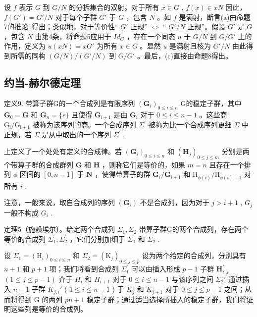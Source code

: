 设 \(f\) 表示 \(G\) 到 \(G/N\) 的分拆集合的双射。对于所有 \(x \in G\) , \(f(x) \in xN\) 因此， \(f(G') = G'/N\) 对于每个子群 \(G'\) 于 \(G\) ，包含 \(N\) 。如 \(f\) 是满射，断言(a)由命题7的推论1得出；类似地，对于等价性“ \(G'\) 正规'' \(\Leftrightarrow\) `` \(G'/N\) 正规''。假设 \(G'\) 是 \(G\) ，包含 \(N\) 由第4条，将命题5应用于 \(Id_G\) ，存在一个同态 \(u\) 于 \(G/N\) 到 \(G/G'\) 上的作用，定义为 \(u(xN) = xG'\) 为所有 \(x \in G\) 。显然 \(u\) 是满射且核为 \(G'/N\) 由此得到所需的同构 \((G/N)/(G'/N)\) 到 \(G/G'\) 。最后，(c)直接由命题8得出。

\subsection{约当-赫尔德定理}

定义9. 带算子群G的一个合成列是有限序列 \((\mathbf{G}_i)_{0\leqslant i\leqslant n}\) G的稳定子群，其中 \(\mathbf{G}_0 = \mathbf{G}\) 和 \(\mathbf{G}_n = \{e\}\) 且使得 \(\mathbf{G}_{i + 1}\) 是由 \(\mathbf{G}_i\) 对于 \(0\leqslant i\leqslant n - 1\) 。这些商 \(\mathrm{G_i / G_{i + 1}}\) 被称为该序列的商。一个合成序列 \(\Sigma^{\prime}\) 被称为比一个合成序列更细 \(\Sigma\) 中正规，若 \(\Sigma\) 是从中取出的一个序列 \(\Sigma^{\prime}\) .

上定义了一个处处有定义的合成律。若 \((\mathbf{G}_i)_{0\leqslant i\leqslant n}\) 和 \((\mathbf{H}_j)_{0\leqslant j\leqslant m}\) 分别是两个带算子群的合成群列 \(\mathbf{G}\) 和 \(\mathbf{H}\) ，则称它们是等价的，如果 \(m = n\) 且存在一个排列 \(\phi\) 区间的 \([0,n - 1]\) 于 \(\mathbf{N}\) ，使得带算子的群 \(\mathbf{G}_i / \mathbf{G}_{i + 1}\) 和 \(\mathrm{H}_{\phi (i)} / \mathrm{H}_{\phi (i) + 1}\) 对所有 \(i\) .

注意，一般来说，取自合成列的序列 \((\mathbf{G}_{i})\) 不是合成列，因为对于 \(j > i + 1\) , \(G_{j}\) 一般不构成 \(G_{i}\) .

定理5（施赖埃尔）。给定两个合成列 \(\Sigma_{1}, \Sigma_{2}\) 带算子群G的两个合成列，存在两个等价的合成列 \(\Sigma_{1}^{\prime}, \Sigma_{2}^{\prime}\) ，它们分别加细于 \(\Sigma_{1}\) 和 \(\Sigma_{2}\) .

设 \(\Sigma_{1} = (\mathrm{H}_{i})_{0\leqslant i\leqslant n}\) 和 \(\Sigma_{2} = (\mathrm{K}_{j})_{0\leqslant j\leqslant p}\) 设为两个给定的合成列，分别具有 \(n + 1\) 和 \(p + 1\) 项；我们将看到合成列 \(\Sigma_1^\prime\) 可以由插入形成 \(p - 1\) 子群 \(\mathbf{H}_{i,j}^{\prime}\) \((1 \leqslant j \leqslant p - 1)\) 介于 \(H_{i}\) 和 \(H_{i+1}\) 对于 \(0 \leqslant i \leqslant n - 1\) 与该序列之间 \(\Sigma_{2}'\) 通过插入 \(n - 1\) 子群 \(K_{j,i}'\) ( \(1 \leqslant i \leqslant n - 1\) ) 于 \(K_{j}\) 和 \(K_{j+1}\) 对于 \(0 \leqslant j \leqslant p - 1\) 之间；从而将得到 G 的两列 \(pn + 1\) 稳定子群；通过适当选择所插入的稳定子群，我们将证明这些列是等价的合成列。

